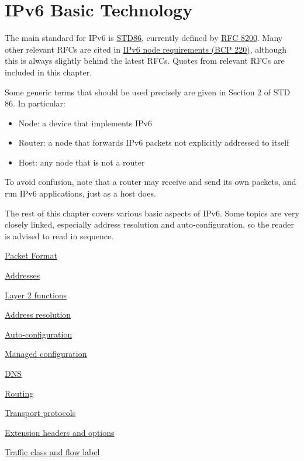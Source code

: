 \documentclass[
]{article}
\begin{document}
\pagebreak

\section{IPv6 Basic Technology}\label{ipv6-basic-technology}

The main standard for IPv6 is
\href{https://www.rfc-editor.org/info/std86}{STD86}, currently defined
by \href{https://www.rfc-editor.org/info/rfc8200}{RFC 8200}. Many other
relevant RFCs are cited in
\href{https://www.rfc-editor.org/info/bcp220}{IPv6 node requirements
(BCP 220)}, although this is always slightly behind the latest RFCs.
Quotes from relevant RFCs are included in this chapter.

Some generic terms that should be used precisely are given in Section 2
of STD 86. In particular:

\begin{itemize}
\item
  Node: a device that implements IPv6
\item
  Router: a node that forwards IPv6 packets not explicitly addressed to
  itself
\item
  Host: any node that is not a router
\end{itemize}

To avoid confusion, note that a router may receive and send its own
packets, and run IPv6 applications, just as a host does.

The rest of this chapter covers various basic aspects of IPv6. Some
topics are very closely linked, especially address resolution and
auto-configuration, so the reader is advised to read in sequence.

\hyperref[packet-format]{Packet Format}

\hyperref[addresses]{Addresses}

\hyperref[layer-2-functions]{Layer 2 functions}

\hyperref[address-resolution]{Address resolution}

\hyperref[auto-configuration]{Auto-configuration}

\hyperref[managed-configuration]{Managed configuration}

\hyperref[dns]{DNS}

\hyperref[routing]{Routing}

\hyperref[transport-protocols]{Transport protocols}

\hyperref[extension-headers-and-options]{Extension headers and options}

\hyperref[traffic-class-and-flow-label]{Traffic class and flow label}
\end{document}
